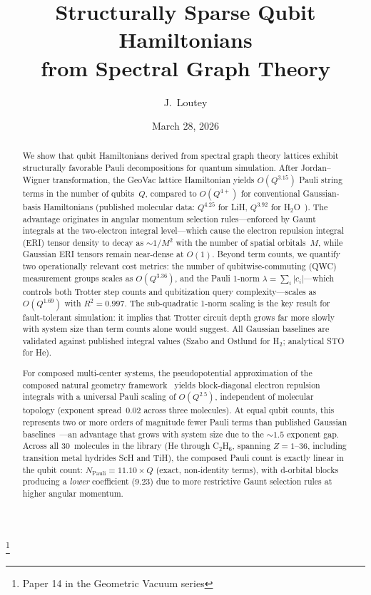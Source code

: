 \documentclass[aps,pra,twocolumn,superscriptaddress,longbibliography]{revtex4-2}
\begin{document}
\title{Structurally Sparse Qubit Hamiltonians\\from Spectral Graph Theory}
\thanks{Paper 14 in the Geometric Vacuum series}

\author{J.~Loutey}

\date{March 28, 2026}

\begin{abstract}
We show that qubit Hamiltonians derived from spectral graph theory lattices
exhibit structurally favorable Pauli decompositions for quantum simulation.
After Jordan--Wigner transformation, the GeoVac lattice Hamiltonian yields
$O(Q^{3.15})$ Pauli string terms in the number of qubits~$Q$, compared
to $O(Q^{4+})$ for conventional Gaussian-basis Hamiltonians
(published molecular data: $Q^{4.25}$ for LiH, $Q^{3.92}$ for
H$_2$O~\cite{trenev2025}).  The advantage originates in angular momentum
selection rules---enforced by Gaunt integrals at the two-electron integral
level---which cause the electron repulsion integral (ERI) tensor density
to decay as $\sim 1/M^2$ with the number of spatial orbitals~$M$, while
Gaussian ERI tensors remain near-dense at $O(1)$.
Beyond term counts, we quantify two operationally relevant cost metrics:
the number of qubitwise-commuting (QWC) measurement groups scales as
$O(Q^{3.36})$, and the Pauli 1-norm
$\lambda = \sum_i |c_i|$---which controls both Trotter step counts and
qubitization query complexity---scales as $O(Q^{1.69})$ with
$R^2 = 0.997$.  The sub-quadratic 1-norm scaling is the key result
for fault-tolerant simulation: it implies that Trotter circuit depth
grows far more slowly with system size than term counts alone would
suggest.
All Gaussian baselines are validated against published integral values
(Szabo and Ostlund for H$_2$; analytical STO for He).

For composed multi-center systems, the
pseudopotential approximation of the composed natural geometry
framework~\cite{loutey_paper17} yields block-diagonal electron
repulsion integrals with a universal Pauli scaling of $O(Q^{2.5})$,
independent of molecular topology (exponent spread~$0.02$ across three
molecules).  At equal qubit counts, this represents two or more
orders of magnitude fewer Pauli terms than published Gaussian
baselines~\cite{trenev2025}---an advantage that grows with system size
due to the $\sim 1.5$ exponent gap.  Across all 30~molecules in the
library (He through C$_2$H$_6$, spanning $Z = 1$--36, including
transition metal hydrides ScH and TiH), the composed
Pauli count is exactly linear in the qubit count:
$N_{\mathrm{Pauli}} = 11.10 \times Q$ (exact, non-identity terms), with d-orbital blocks
producing a \emph{lower} coefficient (9.23) due to more restrictive
Gaunt selection rules at higher angular momentum.
\end{abstract}
\end{document}

